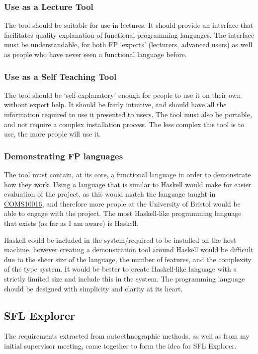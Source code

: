 \subsubsection{Use as a Lecture Tool} The tool should be suitable for use in lectures. It should provide an interface that facilitates quality explanation of functional programming languages. The interface must be understandable, for both \ac{FP} `experts' (lecturers, advanced users) as well as people who have never seen a functional language before. 

\subsubsection{Use as a Self Teaching Tool} The tool should be `self-explanatory' enough for people to use it on their own without expert help. It should be fairly intuitive, and should have all the information required to use it presented to users. The tool must also be portable, and not require a complex installation process. The less complex this tool is to use, the more people will use it. 

\subsubsection{Demonstrating \ac{FP} languages} The tool must contain, at its core, a functional language in order to demonstrate how they work. Using a language that is similar to Haskell would make for easier evaluation of the project, as this would match the language taught in \hyperref[COMS10016]{COMS10016}, and therefore more people at the University of Bristol would be able to engage with the project. The most Haskell-like programming language that exists (as far as I am aware) is Haskell. 

Haskell could be included in the system/required to be installed on the host machine, however creating a demonstration tool around Haskell would be difficult due to the sheer size of the language, the number of features, and the complexity of the type system. It would be better to create Haskell-like language with a strictly limited size and include this in the system. The programming language should be designed with simplicity and clarity at its heart.

\subsection{SFL Explorer}
The requirements extracted from autoethnographic methods, as well as from my initial supervisor meeting, came together to form the idea for SFL Explorer. 

